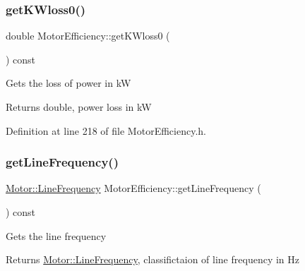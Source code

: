 \mbox{\label{class_motor_efficiency_a47398ac8203f5b79a0ca435673a4bc16}} 
\subsubsection{\texorpdfstring{get\+K\+Wloss0()}{getKWloss0()}\hspace{0.1cm}{\footnotesize\ttfamily [3/3]}}
{\footnotesize\ttfamily double Motor\+Efficiency\+::get\+K\+Wloss0 (\begin{DoxyParamCaption}{ }\end{DoxyParamCaption}) const\hspace{0.3cm}{\ttfamily [inline]}}

Gets the loss of power in kW

\begin{DoxyReturn}{Returns}
double, power loss in kW 
\end{DoxyReturn}


Definition at line 218 of file Motor\+Efficiency.\+h.

\mbox{\label{class_motor_efficiency_a3cc0ed606154a04d035399e05d1cb02a}} 
\subsubsection{\texorpdfstring{get\+Line\+Frequency()}{getLineFrequency()}\hspace{0.1cm}{\footnotesize\ttfamily [1/3]}}
{\footnotesize\ttfamily \hyperlink{class_motor_acee1bdf1b684ad36cb80dc2829d9fcee}{Motor\+::\+Line\+Frequency} Motor\+Efficiency\+::get\+Line\+Frequency (\begin{DoxyParamCaption}{ }\end{DoxyParamCaption}) const\hspace{0.3cm}{\ttfamily [inline]}}

Gets the line frequency

\begin{DoxyReturn}{Returns}
\hyperlink{class_motor_acee1bdf1b684ad36cb80dc2829d9fcee}{Motor\+::\+Line\+Frequency}, classifictaion of line frequency in Hz 
\end{DoxyReturn}


